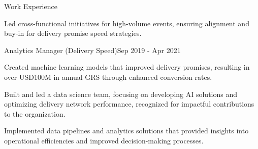 \documentclass{resume} %
\begin{document}
\begin{rSection}{Work Experience}
\begin{rSubsection}
                                    \item Led cross-functional initiatives for high-volume events, ensuring alignment and buy-in for delivery promise speed strategies.
                            \end{rSubsection}
                    \begin{rSubsection}
                {Analytics Manager (Delivery Speed)}{Sep 2019 - Apr 2021}
                {}
                {}
                                    \item Created machine learning models that improved delivery promises, resulting in over USD100M in annual GRS through enhanced conversion rates.
                                    \item Built and led a data science team, focusing on developing AI solutions and optimizing delivery network performance, recognized for impactful contributions to the organization.
                                    \item Implemented data pipelines and analytics solutions that provided insights into operational efficiencies and improved decision-making processes.
                            \end{rSubsection}
            \end{rSection}
\end{document}
